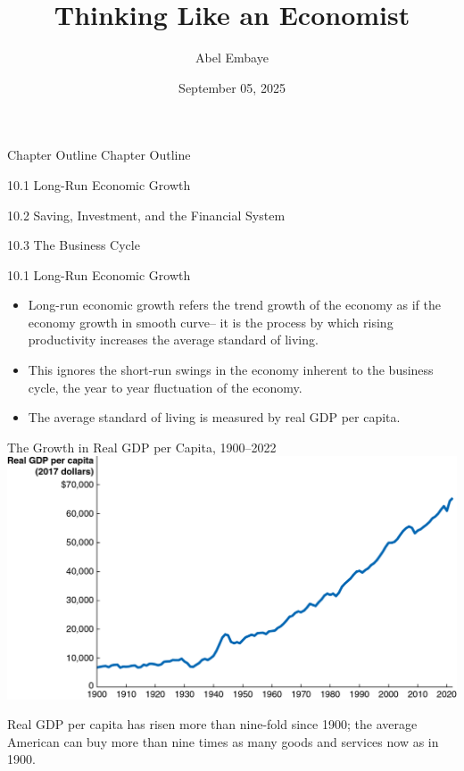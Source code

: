 \documentclass[
  12pt,
  ignorenonframetext,
]{beamer}
\title{Thinking Like an Economist}
\author{Abel Embaye}
\date{September 05, 2025}
\institute{Department of Economics\\
\strut \\
UofA\\}
\begin{document}
\frame{\titlepage}

\begin{frame}{Chapter Outline}
\label{chapter-outline}
Chapter Outline

10.1 Long-Run Economic Growth

10.2 Saving, Investment, and the Financial System

10.3 The Business Cycle
\end{frame}

\begin{frame}{10.1 Long-Run Economic Growth}
\label{long-run-economic-growth}
\begin{itemize}
\item
  Long-run economic growth refers the trend growth of the economy as if
  the economy growth in smooth curve-- it is the process by which rising
  productivity increases the average standard of living.
\item
  This ignores the short-run swings in the economy inherent to the
  business cycle, the year to year fluctuation of the economy.
\item
  The average standard of living is measured by real GDP per capita.
\end{itemize}
\end{frame}

\begin{frame}{The Growth in Real GDP per Capita, 1900--2022}
\label{the-growth-in-real-gdp-per-capita-19002022}
\includegraphics[width=\textwidth,height=0.99\textheight]{imgs3/img_slide06a.png}

Real GDP per capita has risen more than nine-fold since 1900; the
average American can buy more than nine times as many goods and services
now as in 1900.
\end{frame}
\end{document}
